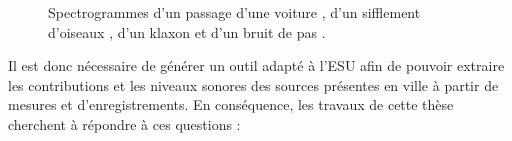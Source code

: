 \begin{figure}[h]
\centering
{}
\caption{Spectrogrammes d'un passage d'une voiture , d'un sifflement d'oiseaux , d'un klaxon  et d'un bruit de pas .}
\label{fig:sourceUrbain}
\end{figure}

Il est donc nécessaire de générer un outil adapté à l'ESU afin de pouvoir extraire les contributions et les niveaux sonores des sources présentes en ville à partir de mesures et d'enregistrements. En conséquence, les travaux de cette thèse cherchent à répondre à ces questions :

